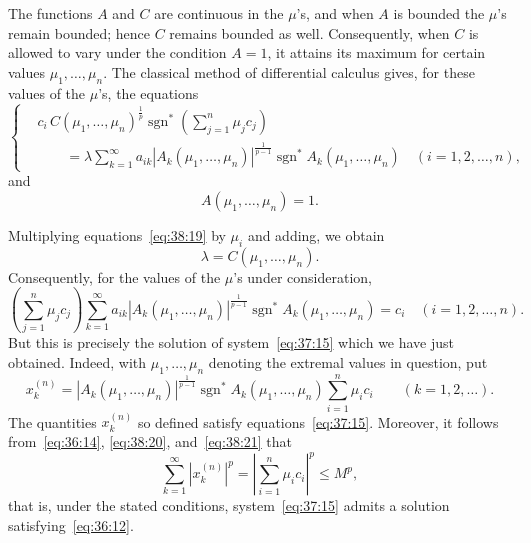 \documentclass[
  paper=b5,
  fontsize=13pt,
  twoside=true,
  open=any,
  bookmarkpackage=false,
  chapterprefix=true,
  headings=normal
]{scrbook}
\theoremstyle{definition}
\begin{document}
The functions $A$ and $C$ are continuous in the $\mu$'s, and when $A$ is bounded the $\mu$'s remain bounded; hence $C$ remains bounded as well. Consequently, when $C$ is allowed to vary under the condition $A=1$, it attains its maximum for certain values $\mu_1,\ldots,\mu_n$. The classical method of differential calculus gives, for these values of the $\mu$'s, the equations
\begin{equation}
\left\{
\begin{aligned}
 &c_i\,C(\mu_1,\ldots,\mu_n)^{\frac1p}
 \operatorname{sgn}^{*}\!\left(\sum_{j=1}^{n}\mu_jc_j\right)\\
 &\qquad=\lambda\sum_{k=1}^{\infty}a_{ik}
 |A_k(\mu_1,\ldots,\mu_n)|^{\frac1{p-1}}
 \operatorname{sgn}^{*}A_k(\mu_1,\ldots,\mu_n)
 \quad(i=1,2,\ldots,n),
\end{aligned}
\right.
\tag{19}\label{eq:38:19}
\end{equation}
and
\begin{equation}
 A(\mu_1,\ldots,\mu_n)=1.
 \tag{20}\label{eq:38:20}
\end{equation}

Multiplying equations~\eqref{eq:38:19} by $\mu_i$ and adding, we obtain
\[
 \lambda=C(\mu_1,\ldots,\mu_n).
\]
Consequently, for the values of the $\mu$'s under consideration,
\[
 \left(\sum_{j=1}^{n}\mu_jc_j\right)
 \sum_{k=1}^{\infty}a_{ik}|A_k(\mu_1,\ldots,\mu_n)|^{\frac1{p-1}}
 \operatorname{sgn}^{*}A_k(\mu_1,\ldots,\mu_n)
 =c_i
 \quad(i=1,2,\ldots,n).
\]
But this is precisely the solution of system~\eqref{eq:37:15} which we have just obtained. Indeed, with $\mu_1,\ldots,\mu_n$ denoting the extremal values in question, put
\begin{equation}
 x_k^{(n)}=
 |A_k(\mu_1,\ldots,\mu_n)|^{\frac1{p-1}}
 \operatorname{sgn}^{*}A_k(\mu_1,\ldots,\mu_n)
 \sum_{i=1}^{n}\mu_i c_i
 \qquad(k=1,2,\ldots).
 \tag{21}\label{eq:38:21}
\end{equation}
The quantities $x_k^{(n)}$ so defined satisfy equations~\eqref{eq:37:15}. Moreover, it follows from~\eqref{eq:36:14}, \eqref{eq:38:20}, and~\eqref{eq:38:21} that
\begin{equation}
 \sum_{k=1}^{\infty}|x_k^{(n)}|^p
 =\left|\sum_{i=1}^{n}\mu_i c_i\right|^p
 \leq M^p,
 \tag{22}\label{eq:38:22}
\end{equation}
that is, under the stated conditions, system~\eqref{eq:37:15} admits a solution satisfying~\eqref{eq:36:12}.
\end{document}
